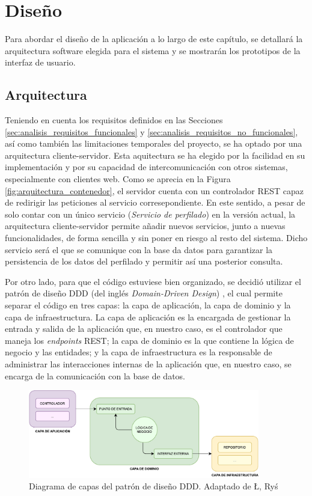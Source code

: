 \chapter{Diseño}
\label{chap:diseño}

Para abordar el diseño de la aplicación a lo largo de este capítulo, se detallará la arquitectura software elegida para el sistema
y se mostrarán los prototipos de la interfaz de usuario.

\section{Arquitectura}
\label{sec:diseño_arquitectura}

Teniendo en cuenta los requisitos definidos en las Secciones \ref{sec:analisis_requisitos_funcionales} y \ref{sec:analisis_requisitos_no_funcionales},
así como también las limitaciones temporales del proyecto, se ha optado por una arquitectura cliente-servidor. Esta aquitectura se ha elegido
por la facilidad en su implementación y por su capacidad de intercomunicación con otros sistemas, especialmente con clientes web. Como
se aprecia en la Figura \ref{fig:arquitectura_contenedor}, el servidor cuenta con un controlador REST capaz de redirigir las peticiones al servicio
corresepondiente. En este sentido, a pesar de solo contar con un único servicio (\textit{Servicio de perfilado}) en la versión actual,
la arquitectura cliente-servidor permite añadir nuevos servicios, junto a nuevas funcionalidades, de forma sencilla y sin poner en riesgo al resto del sistema.
Dicho servicio será el que se comunique con la base da datos para garantizar la persistencia de los datos del perfilado y permitir así
una posterior consulta.

\bigskip
Por otro lado, para que el código estuviese bien organizado, se decidió utilizar el patrón de diseño DDD (del inglés \textit{Domain-Driven Design}) \cite{ddd}, el cual
permite separar el código en tres capas: la capa de aplicación, la capa de dominio y la capa de infraestructura. La capa de aplicación es la encargada de gestionar
la entrada y salida de la aplicación que, en nuestro caso, es el controlador que maneja los \textit{endpoints} REST; la capa de dominio es la que contiene la lógica
de negocio y las entidades; y la capa de infraestructura es la responsable de administrar las interacciones internas de la aplicación que, en nuestro
caso, se encarga de la comunicación con la base de datos.

\begin{figure}[H]
	\centering
	\includegraphics[width=0.9\textwidth]{diagramas/ddd.pdf}
	\caption{Diagrama de capas del patrón de diseño DDD. Adaptado de Ł, Ryś \cite{dddblog}}
	\label{fig:ddd}
\end{figure}


